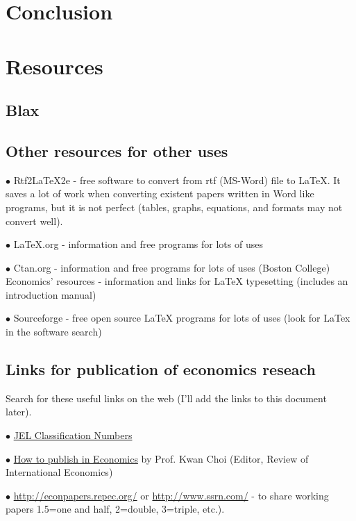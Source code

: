 \documentclass[12pt]{article}%
\begin{document}
\section{Conclusion}



\section{Resources}

\subsection{Blax}

\subsection{Other resources for other uses}

$\bullet$ Rtf2LaTeX2e - free software to convert from rtf (MS-Word) file to LaTeX. It saves a lot of work when converting existent papers written in Word like programs, but it is not perfect (tables, graphs, equations, and formats may not convert well).

$\bullet$ LaTeX.org - information and free programs for lots of uses

$\bullet$ Ctan.org - information and free programs for lots of uses
(Boston College) Economics' resources - information and links for LaTeX typesetting (includes an introduction manual)

$\bullet$ Sourceforge - free open source LaTeX programs for lots of uses (look for LaTex in the software search)

\subsection{Links for publication of economics reseach}

Search for these useful links on the web (I'll add the links to this document later).

$\bullet$
\href{http://www.aeaweb.org/journal/jel_class_system.php}{JEL Classification Numbers}


$\bullet$
\href{http://www.roie.org/howi.htm}{How to publish in Economics} by Prof. Kwan Choi (Editor, Review of International Economics)

$\bullet$
\href{http://econpapers.repec.org/}{http://econpapers.repec.org/} or \href{http://www.ssrn.com/}{http://www.ssrn.com/}  - to share working papers
1.5=one and half, 2=double, 3=triple, etc.).
\end{document}

